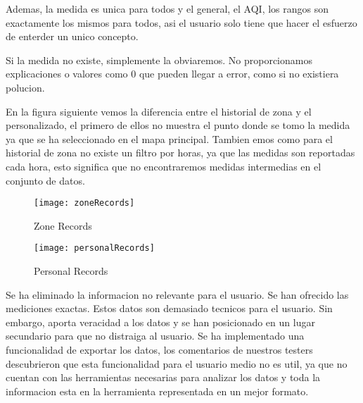 Ademas, la medida es unica para todos y el general, el AQI, los rangos son exactamente los mismos para todos, asi el usuario
solo tiene que hacer el esfuerzo de enterder un unico concepto. 

Si la medida no existe, simplemente la obviaremos. No proporcionamos explicaciones o valores como 0 que pueden llegar a 
error, como si no existiera polucion.


En la figura siguiente vemos la diferencia entre el historial de zona y el personalizado, el primero de ellos no muestra
el punto donde se tomo la medida ya que se ha seleccionado en el mapa principal. Tambien emos como para el historial de 
zona no existe un filtro por horas, ya que las medidas son reportadas cada hora, esto significa que no encontraremos 
medidas intermedias en el conjunto de datos.
 
\begin{figure}[ht]
    \centering
    \texttt{[image: zoneRecords]}
    \caption{Zone Records}
\end{figure}
\begin{figure}[ht]
    \centering
    \texttt{[image: personalRecords]}
    \caption{Personal Records}
\end{figure}


\begin{itemize}
    \done Se ha eliminado la informacion no relevante para el usuario.
    \crossed Se han ofrecido las mediciones exactas. Estos datos son demasiado tecnicos para el usuario. Sin embargo,
    aporta veracidad a los datos y se han  posicionado en un lugar secundario para que no distraiga al usuario.
    \crossed Se ha implementado una funcionalidad de exportar los datos, los comentarios de nuestros testers descubrieron
    que esta funcionalidad para el usuario medio no es util, ya que no cuentan con las herramientas necesarias para
    analizar los datos y toda la informacion esta en la herramienta representada en un mejor formato.
    
\end{itemize}
 \newpage
